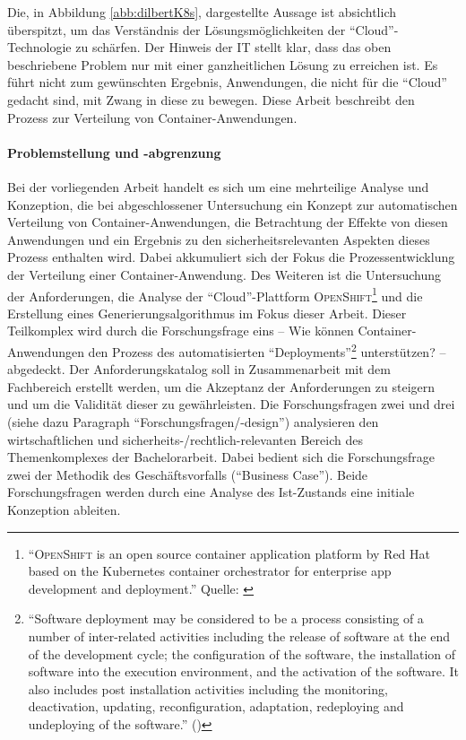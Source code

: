 Die, in Abbildung \vref{abb:dilbertK8s}, dargestellte Aussage ist absichtlich überspitzt, um das Verständnis der Lösungsmöglichkeiten der \enquote{Cloud}-Technologie zu schärfen. Der Hinweis der IT stellt klar, dass das oben beschriebene Problem nur mit einer ganzheitlichen Lösung zu erreichen ist. Es führt nicht zum gewünschten Ergebnis, Anwendungen, die nicht für die \enquote{Cloud} gedacht sind, mit Zwang in diese zu bewegen. Diese Arbeit beschreibt den Prozess zur Verteilung von Container-Anwendungen. 

\paragraph{Problemstellung und -abgrenzung}
Bei der vorliegenden Arbeit handelt es sich um eine mehrteilige Analyse und Konzeption, die bei abgeschlossener Untersuchung ein Konzept zur automatischen Verteilung von Container-Anwendungen, die Betrachtung der Effekte von diesen Anwendungen und ein Ergebnis zu den sicherheitsrelevanten Aspekten dieses Prozess enthalten wird. Dabei akkumuliert sich der Fokus die Prozessentwicklung der Verteilung einer Container-Anwendung. Des Weiteren ist die Untersuchung der Anforderungen, die Analyse der \enquote{Cloud}-Plattform \textsc{OpenShift}\footnote{\enquote{\textsc{OpenShift} is an open source container application platform by Red Hat based on the Kubernetes container orchestrator for enterprise app development and deployment.} Quelle: \cite[][]{red_hat_inc_openshift_2020}} und die Erstellung eines Generierungsalgorithmus im Fokus dieser Arbeit. Dieser Teilkomplex wird durch die Forschungsfrage eins -- Wie können Container-Anwendungen den Prozess des automatisierten \enquote{Deployments}\footnote{\enquote{Software deployment may be considered to be a process consisting of a number of inter-related activities including the release of software at the end of the development cycle; the configuration of the software, the installation of software into the execution environment, and the activation of the software. It also includes post installation activities including the monitoring, deactivation, updating, reconfiguration, adaptation, redeploying and undeploying of the software.} (\cite{dearle_software_2007})} unterstützen? -- abgedeckt. Der Anforderungskatalog soll in Zusammenarbeit mit dem Fachbereich erstellt werden, um die Akzeptanz der Anforderungen zu steigern und um die Validität dieser zu gewährleisten. Die Forschungsfragen zwei und drei (siehe dazu Paragraph \enquote{Forschungsfragen/-design}) analysieren den wirtschaftlichen und sicherheits-/rechtlich-relevanten Bereich des Themenkomplexes der Bachelorarbeit. Dabei bedient sich die Forschungsfrage zwei der Methodik des Geschäftsvorfalls (\enquote{Business Case}). Beide Forschungsfragen werden durch eine Analyse des Ist-Zustands eine initiale Konzeption ableiten. 
